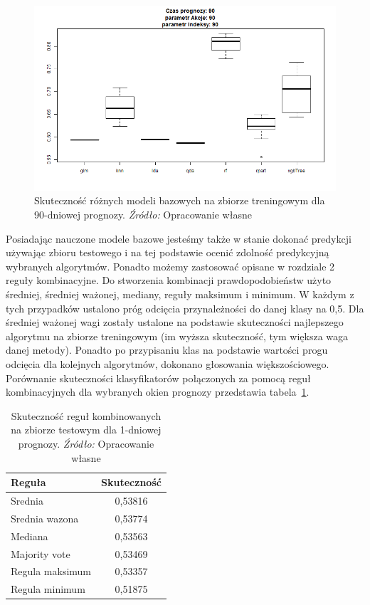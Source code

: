 \documentclass[12pt,a4paper,twoside,openany]{book}
\begin{document}
\begin{figure}
\centering
\includegraphics[scale=0.5]{./rys010b}
\caption{Skuteczność różnych modeli bazowych na zbiorze treningowym dla 90-dniowej prognozy. \textit{Źródło:} Opracowanie własne}\label{rys010b}
\end{figure}


Posiadając nauczone modele bazowe jesteśmy także w stanie dokonać predykcji używając zbioru testowego i na tej podstawie ocenić zdolność predykcyjną wybranych algorytmów. Ponadto możemy zastosować opisane w rozdziale 2 reguły kombinacyjne. Do stworzenia kombinacji prawdopodobieństw użyto średniej, średniej ważonej, mediany, reguły maksimum i minimum. W każdym z tych przypadków ustalono próg odcięcia przynależności do danej klasy na 0,5. Dla średniej ważonej wagi zostały ustalone na podstawie skuteczności najlepszego algorytmu na zbiorze treningowym (im wyższa skuteczność, tym większa waga danej metody). Ponadto po przypisaniu klas na podstawie wartości progu odcięcia dla kolejnych algorytmów, dokonano głosowania większościowego. Porównanie skuteczności klasyfikatorów połączonych za pomocą reguł kombinacyjnych dla wybranych okien prognozy przedstawia tabela~\ref{tab009}.


\begin{table}[ht] 
\caption{Skuteczność reguł kombinowanych na zbiorze testowym dla 1-dniowej prognozy. \textit{Źródło:} Opracowanie własne}
\label{tab009}
\centering
\begin{tabular}{lc}
  \hline
Reguła & Skuteczność\\
  \hline
Srednia & 0,53816\\
Srednia wazona & 0,53774\\
Mediana & 0,53563\\
Majority vote & 0,53469\\
Regula maksimum & 0,53357\\
Regula minimum & 0,51875\\
  \hline
\end{tabular}
\end{table}
\end{document}
